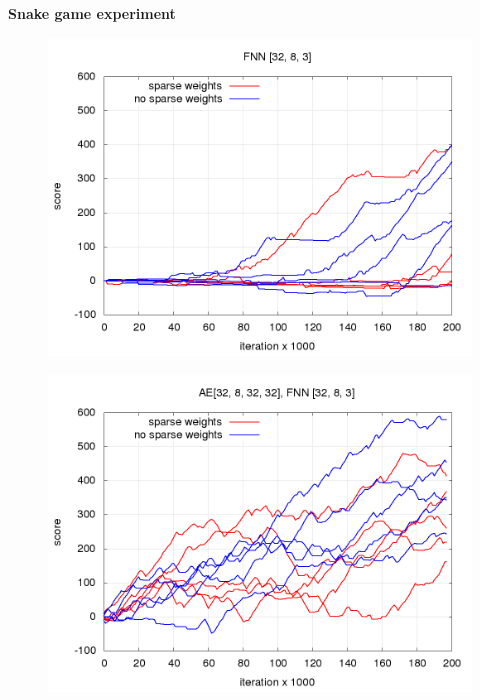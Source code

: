 \documentclass[xcolor=dvipsnames]{beamer}
\begin{document}
\begin{frame}{\bf Snake game experiment}
\begin{figure}[!htb]
\centering
\begin{minipage}{.5\textwidth}
  \centering
  \includegraphics[scale=0.17]{../../results/rl_worms/fnn_progress/training_progress.png}
  \label{img:worms FNN score progress comparison}
\end{minipage}%
\begin{minipage}{.5\textwidth}
  \centering
  \includegraphics[scale=0.17]{../../results/rl_worms/hnn_progress/training_progress.png}
  \label{img:worms AE+FNN score progress comparison}
\end{minipage}
\end{figure}

\end{frame}
\end{document}
